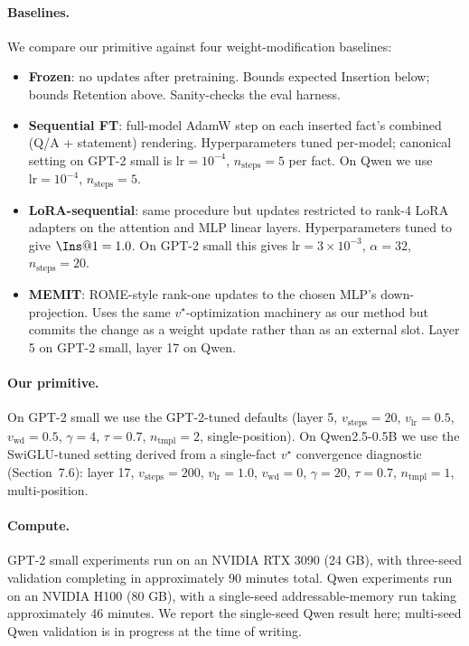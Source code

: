 \documentclass[11pt,a4paper]{article}
\begin{document}
\paragraph{Baselines.} We compare our primitive against four
weight-modification baselines:
\begin{itemize}[leftmargin=*,topsep=2pt,itemsep=1pt]
\item \textbf{Frozen}: no updates after pretraining. Bounds expected
Insertion below; bounds Retention above. Sanity-checks the eval harness.
\item \textbf{Sequential FT}: full-model AdamW step on each inserted
fact's combined (Q/A + statement) rendering. Hyperparameters tuned
per-model; canonical setting on GPT-2 small is $\text{lr} = 10^{-4}$,
$n_\text{steps} = 5$ per fact. On Qwen we use $\text{lr} = 10^{-4}$,
$n_\text{steps} = 5$.
\item \textbf{LoRA-sequential}: same procedure but updates restricted to
rank-4 LoRA adapters on the attention and MLP linear layers.
Hyperparameters tuned to give $\Ins@1 = 1.0$. On GPT-2 small this gives
$\text{lr} = 3 \times 10^{-3}$, $\alpha = 32$, $n_\text{steps} = 20$.
\item \textbf{MEMIT}: ROME-style rank-one updates to the chosen MLP's
down-projection. Uses the same $v^\star$-optimization machinery as our
method but commits the change as a weight update rather than as an
external slot. Layer 5 on GPT-2 small, layer 17 on Qwen.
\end{itemize}

\paragraph{Our primitive.} On GPT-2 small we use the GPT-2-tuned defaults
(layer 5, $v_\text{steps} = 20$, $v_\text{lr} = 0.5$, $v_\text{wd} = 0.5$,
$\gamma = 4$, $\tau = 0.7$, $n_\text{tmpl} = 2$, single-position).
On Qwen2.5-0.5B we use the SwiGLU-tuned setting derived from a
single-fact $v^\star$ convergence diagnostic (Section~7.6): layer 17,
$v_\text{steps} = 200$, $v_\text{lr} = 1.0$, $v_\text{wd} = 0$,
$\gamma = 20$, $\tau = 0.7$, $n_\text{tmpl} = 1$, multi-position.

\paragraph{Compute.} GPT-2 small experiments run on an NVIDIA RTX 3090
(24 GB), with three-seed validation completing in approximately 90 minutes
total. Qwen experiments run on an NVIDIA H100 (80 GB), with a single-seed
addressable-memory run taking approximately 46 minutes. We report the
single-seed Qwen result here; multi-seed Qwen validation is in progress
at the time of writing.
\end{document}
